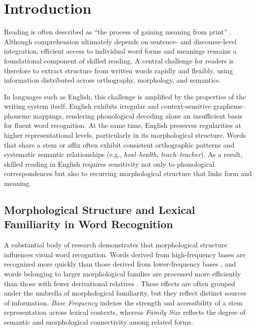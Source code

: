 \documentclass[preprint,12pt, authoryear, review]{elsarticle}
\begin{document}
\linenumbers

\section{Introduction}

Reading is often described as “the process of gaining meaning from print” \citep[][p.~34]{raynerHowPsychologicalScience2001}. Although comprehension ultimately depends on sentence- and discourse-level integration, efficient access to individual word forms and meanings remains a foundational component of skilled reading. A central challenge for readers is therefore to extract structure from written words rapidly and flexibly, using information distributed across orthography, morphology, and semantics.

In languages such as English, this challenge is amplified by the properties of the writing system itself. English exhibits irregular and context-sensitive grapheme–phoneme mappings, rendering phonological decoding alone an insufficient basis for fluent word recognition. At the same time, English preserves regularities at higher representational levels, particularly in its morphological structure. Words that share a stem or affix often exhibit consistent orthographic patterns and systematic semantic relationships (e.g., \textit{heal}–\textit{health}, \textit{teach}–\textit{teacher}). As a result, skilled reading in English requires sensitivity not only to phonological correspondences but also to recurring morphological structure that links form and meaning.

\subsection{Morphological Structure and Lexical Familiarity in Word Recognition}

A substantial body of research demonstrates that morphological structure influences visual word recognition. Words derived from high-frequency bases are recognized more quickly than those derived from lower-frequency bases \citep{taftRecognitionAffixedWords1979}, and words belonging to larger morphological families are processed more efficiently than those with fewer derivational relatives \citep{schreuderHowComplexSimplex1997}. These effects are often grouped under the umbrella of morphological familiarity, but they reflect distinct sources of information. \textit{Base Frequency} indexes the strength and accessibility of a stem representation across lexical contexts, whereas \textit{Family Size} reflects the degree of semantic and morphological connectivity among related forms.
\end{document}
